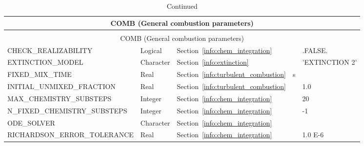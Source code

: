 \documentclass[11pt]{book}
\begin{document}
\begin{longtable}{@{\extracolsep{\fill}}|l|l|l|l|l|}
\caption[General combustion parameters ({\ct COMB} namelist group)]{For more information see Chapter~\ref{info:COMB}.}
\label{tbl:COMB} \\
\hline
\multicolumn{5}{|c|}{{\ct COMB} (General combustion parameters)} \\
\hline \hline
\endfirsthead
\caption[]{Continued} \\
\hline
\multicolumn{5}{|c|}{{\ct COMB} (General combustion parameters)} \\
\hline \hline
\endhead
{\ct CHECK\_REALIZABILITY}                      & Logical       & Section~\ref{info:chem_integration}                   &               & {\ct .FALSE.}        \\ \hline
{\ct EXTINCTION\_MODEL}                         & Character     & Section~\ref{info:extinction}                         &               & {\ct 'EXTINCTION 2'} \\ \hline
{\ct FIXED\_MIX\_TIME}                          & Real          & Section~\ref{info:turbulent_combustion}               &  s            &                      \\ \hline
{\ct INITIAL\_UNMIXED\_FRACTION}                & Real          & Section~\ref{info:turbulent_combustion}               &               & 1.0                  \\ \hline
{\ct MAX\_CHEMISTRY\_SUBSTEPS}                  & Integer       & Section~\ref{info:chem_integration}                   &               & 20                   \\ \hline
{\ct N\_FIXED\_CHEMISTRY\_SUBSTEPS}             & Integer       & Section~\ref{info:chem_integration}                   &               & -1                   \\ \hline
{\ct ODE\_SOLVER}                               & Character     & Section~\ref{info:chem_integration}                   &               &                      \\ \hline
{\ct RICHARDSON\_ERROR\_TOLERANCE}              & Real          & Section~\ref{info:chem_integration}                   &               & 1.0 E-6              \\ \hline

\end{longtable}
\end{document}
